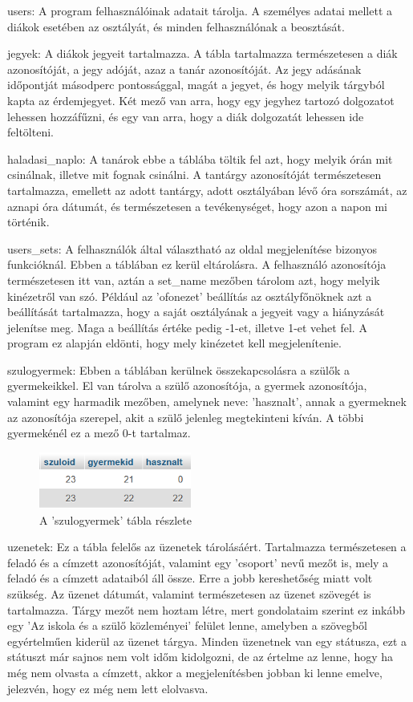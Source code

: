\documentclass[
]{thesis-ekf}
\begin{document}
 users: A program felhasználóinak adatait tárolja. A személyes adatai mellett a diákok esetében az osztályát, és minden felhasználónak a beosztását.
 
 jegyek: A diákok jegyeit tartalmazza. A tábla tartalmazza természetesen a diák azonosítóját, a jegy adóját, azaz a tanár azonosítóját. Az jegy adásának időpontját másodperc pontossággal, magát a jegyet, és hogy melyik tárgyból kapta az érdemjegyet. Két mező van arra, hogy egy jegyhez tartozó dolgozatot lehessen hozzáfűzni, és egy van arra, hogy a diák dolgozatát lehessen ide feltölteni.
 
 haladasi\_naplo: A tanárok ebbe a táblába töltik fel azt, hogy melyik órán mit csinálnak, illetve mit fognak csinálni. A tantárgy azonosítóját természetesen tartalmazza, emellett az adott tantárgy, adott osztályában lévő óra sorszámát, az aznapi óra dátumát, és természetesen a tevékenységet, hogy azon a napon mi történik.
 
 users\_sets: A felhasználók által választható az oldal megjelenítése bizonyos funkcióknál. Ebben a táblában ez kerül eltárolásra. A felhasználó azonosítója természetesen itt van, aztán a set\_name mezőben tárolom azt, hogy melyik kinézetről van szó. Például az 'ofonezet' beállítás az osztályfőnöknek azt a beállítását tartalmazza, hogy a saját osztályának a jegyeit vagy a hiányzását jelenítse meg. Maga a beállítás értéke pedig -1-et, illetve 1-et vehet fel. A program ez alapján eldönti, hogy mely kinézetet kell megjelenítenie.
 
 szulogyermek: Ebben a táblában kerülnek összekapcsolásra a szülők a gyermekeikkel. El van tárolva a szülő azonosítója, a gyermek azonosítója, valamint egy harmadik mezőben, amelynek neve: 'hasznalt', annak a gyermeknek az azonosítója szerepel, akit a szülő jelenleg megtekinteni kíván. A többi gyermekénél ez a mező 0-t tartalmaz.
 \begin{figure}[ht]
 	\centering
 	\includegraphics[width=5cm]{kepek/szulogyermek}
 	\caption{A 'szulogyermek' tábla részlete}
 	\label{fig:szulogyermek}
 \end{figure}
   
 uzenetek: Ez a tábla felelős az üzenetek tárolásáért. Tartalmazza természetesen a feladó és a címzett azonosítóját, valamint egy 'csoport' nevű mezőt is, mely a feladó és a címzett adataiból áll össze. Erre a jobb kereshetőség miatt volt szükség. Az üzenet dátumát, valamint természetesen az üzenet szövegét is tartalmazza. Tárgy mezőt nem hoztam létre, mert gondolataim szerint ez inkább egy 'Az iskola és a szülő közleményei' felület lenne, amelyben a szövegből egyértelműen kiderül az üzenet tárgya. Minden üzenetnek van egy státusza, ezt a státuszt már sajnos nem volt időm kidolgozni, de az értelme az lenne, hogy ha még nem olvasta a címzett, akkor a megjelenítésben jobban ki lenne emelve, jelezvén, hogy ez még nem lett elolvasva.
\end{document}
